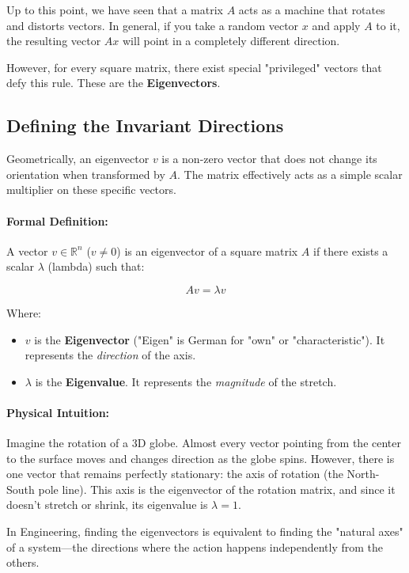 \documentclass[12pt,a4paper,twoside,openright]{book}
\begin{document}
Up to this point, we have seen that a matrix $A$ acts as a machine that rotates and distorts vectors. In general, if you take a random vector $x$ and apply $A$ to it, the resulting vector $Ax$ will point in a completely different direction.

However, for every square matrix, there exist special "privileged" vectors that defy this rule. These are the \textbf{Eigenvectors}.

\subsection{Defining the Invariant Directions}

Geometrically, an eigenvector $v$ is a non-zero vector that does not change its orientation when transformed by $A$. The matrix effectively acts as a simple scalar multiplier on these specific vectors.
\paragraph{Formal Definition:}
A vector $v \in \mathbb{R}^n$ ($v \neq 0$) is an eigenvector of a square matrix $A$ if there exists a scalar $\lambda$ (lambda) such that:

\begin{equation}
Av = \lambda v
\end{equation}

Where:
\begin{itemize}
    \item $v$ is the \textbf{Eigenvector} ("Eigen" is German for "own" or "characteristic"). It represents the \textit{direction} of the axis.
    \item $\lambda$ is the \textbf{Eigenvalue}. It represents the \textit{magnitude} of the stretch.
\end{itemize}
\paragraph{Physical Intuition:}
Imagine the rotation of a 3D globe. Almost every vector pointing from the center to the surface moves and changes direction as the globe spins.
However, there is one vector that remains perfectly stationary: the axis of rotation (the North-South pole line). This axis is the eigenvector of the rotation matrix, and since it doesn't stretch or shrink, its eigenvalue is $\lambda = 1$.

In Engineering, finding the eigenvectors is equivalent to finding the "natural axes" of a system—the directions where the action happens independently from the others.
\end{document}
